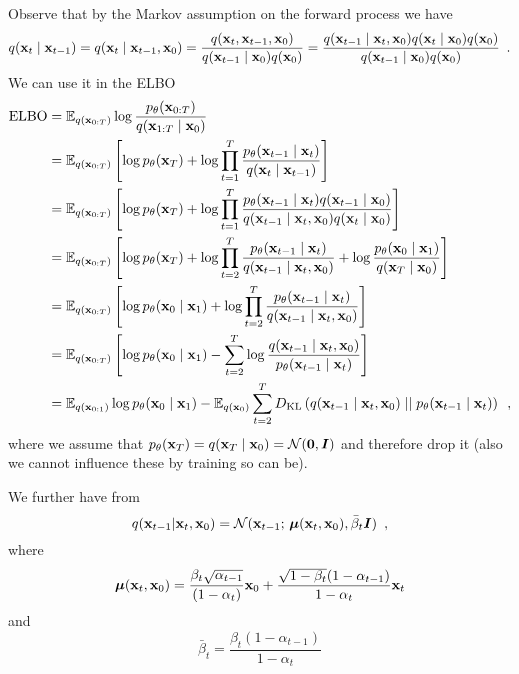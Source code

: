 Observe that by the Markov assumption on the forward process we have
\begin{equation}
    q({\mathbf{x}}_t \mid {\mathbf{x}}_{t-1}) = q({\mathbf{x}}_t \mid {\mathbf{x}}_{t-1}, {\mathbf{x}}_0)
    = \frac{q({\mathbf{x}}_t, {\mathbf{x}}_{t-1}, {\mathbf{x}}_0)}{q({\mathbf{x}}_{t-1} \mid {\mathbf{x}}_0) q({\mathbf{x}}_0)}
    = \frac{q({\mathbf{x}}_{t-1} \mid {\mathbf{x}}_{t}, {\mathbf{x}}_0) q({\mathbf{x}}_{t} \mid {\mathbf{x}}_0) q({\mathbf{x}}_0)}{q({\mathbf{x}}_{t-1} \mid {\mathbf{x}}_0) q({\mathbf{x}}_0)} \enspace .
\end{equation}
We can use it in the ELBO
\begin{align}
    \text{ELBO} & = \mathbb{E}_{q({\mathbf{x}}_{0:T})} \log  \frac{p_{\theta}({\mathbf{x}}_{0:T})}{q({\mathbf{x}}_{1:T} \mid {\mathbf{x}}_0)} \nonumber \\
    & = \mathbb{E}_{q({\mathbf{x}}_{0:T})} \left[ \log p_{\theta}({\mathbf{x}}_T) + \log \prod_{t=1}^T \frac{p_{\theta}({\mathbf{x}}_{t-1} \mid {\mathbf{x}}_{t})}{q({\mathbf{x}}_t \mid {\mathbf{x}}_{t-1})} \right] \nonumber \\
    & = \mathbb{E}_{q({\mathbf{x}}_{0:T})} \left[ \log p_{\theta}({\mathbf{x}}_T) + \log \prod_{t=1}^T 
    \frac{p_{\theta}({\mathbf{x}}_{t-1} \mid {\mathbf{x}}_{t}) q({\mathbf{x}}_{t-1} \mid {\mathbf{x}}_0)}
    {q({\mathbf{x}}_{t-1} \mid {\mathbf{x}}_{t}, {\mathbf{x}}_0) q({\mathbf{x}}_{t} \mid {\mathbf{x}}_0)} \right] \nonumber \\
    & = \mathbb{E}_{q({\mathbf{x}}_{0:T})} \left[ \log p_{\theta}({\mathbf{x}}_T) + \log \prod_{t=2}^T 
    \frac{p_{\theta}({\mathbf{x}}_{t-1} \mid {\mathbf{x}}_{t})}
    {q({\mathbf{x}}_{t-1} \mid {\mathbf{x}}_{t}, {\mathbf{x}}_0)} 
    + \log \frac{p_{\theta}({\mathbf{x}}_{0} \mid {\mathbf{x}}_{1})}{q({\mathbf{x}}_{T} \mid {\mathbf{x}}_0)}
    \right] \nonumber \\
    & = \mathbb{E}_{q({\mathbf{x}}_{0:T})} \left[ \log p_{\theta}({\mathbf{x}}_{0} \mid {\mathbf{x}}_{1}) + \log \prod_{t=2}^T 
    \frac{p_{\theta}({\mathbf{x}}_{t-1} \mid {\mathbf{x}}_{t})}
    {q({\mathbf{x}}_{t-1} \mid {\mathbf{x}}_{t}, {\mathbf{x}}_0)}
    \right] \nonumber \\
    & = \mathbb{E}_{q({\mathbf{x}}_{0:T})} \left[ \log p_{\theta}({\mathbf{x}}_{0} \mid {\mathbf{x}}_{1}) 
    - \sum_{t=2}^T \log  \frac{q({\mathbf{x}}_{t-1} \mid {\mathbf{x}}_{t}, {\mathbf{x}}_0)}
    {p_{\theta}({\mathbf{x}}_{t-1} \mid {\mathbf{x}}_{t})}
    \right] \nonumber \\
    & = \mathbb{E}_{q({\mathbf{x}}_{0:1})} \log p_{\theta}({\mathbf{x}}_{0} \mid {\mathbf{x}}_{1}) 
    - \mathbb{E}_{q({\mathbf{x}}_{0})} \sum_{t=2}^T D_{\mathrm{KL}}\left( q({\mathbf{x}}_{t-1} \mid {\mathbf{x}}_{t}, {\mathbf{x}}_0) \mid\mid p_{\theta}({\mathbf{x}}_{t-1} \mid {\mathbf{x}}_{t}) \right)
    \enspace ,
\end{align}
where we assume that $p_{\theta}({\mathbf{x}}_T) = q({\mathbf{x}}_{T} \mid {\mathbf{x}}_0) = \mathcal{N}(\mathbf{0}, {\bm{I}})$ and therefore drop it (also we cannot influence these by training so can be).

We further have from \cite{ho_denoising_2020}
\begin{equation}
    q({\mathbf{x}}_{t-1} | {\mathbf{x}}_t, {\mathbf{x}}_0) = \mathcal{N}({\mathbf{x}}_{t-1};\, {\bm{\mu}}({\mathbf{x}}_t, {\mathbf{x}}_0), \bar{\beta}_t {\bm{I}}) \enspace ,
\end{equation}
where
\begin{equation}
    {\bm{\mu}}({\mathbf{x}}_t, {\mathbf{x}}_0) = \frac{\beta_t\sqrt{\alpha_{t-1}}}{(1 - \alpha_t)} {\mathbf{x}}_0
    + \frac{\sqrt{1-\beta_t}(1 - \alpha_{t-1})}{1 - \alpha_t}{\mathbf{x}}_t
\end{equation}
and 
\begin{equation}
    \bar{\beta}_t = \frac{\beta_t(1 - \alpha_{t-1})}{1 - \alpha_t} 
\end{equation}

